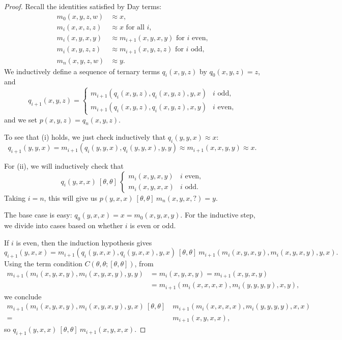\documentclass[letterpaper,11pt]{article}
\begin{document}
\begin{proof} Recall the identities satisfied by Day terms:
\begin{align*}
m_0(x,y,z,w) &\approx x,\\
m_i(x,x,z,z) &\approx x\text{ for all $i$,}\\
m_i(x,y,x,y) &\approx m_{i+1}(x,y,x,y)\text{ for $i$ even,}\\
m_i(x,y,z,z) &\approx m_{i+1}(x,y,z,z)\text{ for $i$ odd,}\\
m_n(x,y,z,w) &\approx y.
\end{align*}
We inductively define a sequence of ternary terms $q_i(x,y,z)$ by $q_0(x,y,z) = z$, and
\[
q_{i+1}(x,y,z) = \begin{cases} m_{i+1}(q_{i}(x,y,z),q_{i}(x,y,z),y,x) & i\text{ odd,}\\ m_{i+1}(q_{i}(x,y,z),q_{i}(x,y,z),x,y) & i\text{ even,}\end{cases}
\]
and we set $p(x,y,z) = q_n(x,y,z)$.

To see that (i) holds, we just check inductively that $q_i(y,y,x) \approx x$:
\[
q_{i+1}(y,y,x) = m_{i+1}(q_i(y,y,x),q_i(y,y,x),y,y) \approx m_{i+1}(x,x,y,y) \approx x.
\]

For (ii), we will inductively check that
\[
q_i(y,x,x)\ [\theta,\theta]\ \begin{cases} m_i(x,y,x,y) & i\text{ even,}\\ m_i(x,y,x,x) & i\text{ odd.}\end{cases}
\]
Taking $i = n$, this will give us $p(y,x,x)\ [\theta,\theta]\ m_n(x,y,x,?) = y$.

The base case is easy: $q_0(y,x,x) = x = m_0(x,y,x,y)$. For the inductive step, we divide into cases based on whether $i$ is even or odd.

If $i$ is even, then the induction hypothesis gives
\[
q_{i+1}(y,x,x) = m_{i+1}(q_i(y,x,x),q_i(y,x,x),y,x)\ [\theta,\theta]\ m_{i+1}(m_i(x,y,x,y),m_i(x,y,x,y),y,x).
\]
Using the term condition $C(\theta,\theta;[\theta,\theta])$, from
\begin{align*}
m_{i+1}(m_i(x,y,x,y),m_i(x,y,x,y),y,\boxed{y}) &= m_i(x,y,x,y) = m_{i+1}(x,y,x,y)\\
&= m_{i+1}(m_i(x,x,x,x),m_i(y,y,y,y),x,\boxed{y}),
\end{align*}
we conclude
\begin{align*}
m_{i+1}(m_i(x,y,x,y),m_i(x,y,x,y),y,\boxed{x})\ [\theta,\theta]\ &m_{i+1}(m_i(x,x,x,x),m_i(y,y,y,y),x,\boxed{x})\\
=\ &m_{i+1}(x,y,x,x),
\end{align*}
so $q_{i+1}(y,x,x)\ [\theta,\theta]\ m_{i+1}(x,y,x,x)$.


\end{proof}
\end{document}
